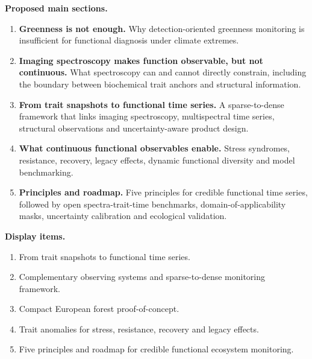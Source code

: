 \documentclass[11pt]{article}
\begin{document}
\textbf{Proposed main sections.}
\begin{enumerate}
\item \textbf{Greenness is not enough.} Why detection-oriented greenness monitoring is insufficient for functional diagnosis under climate extremes.
\item \textbf{Imaging spectroscopy makes function observable, but not continuous.} What spectroscopy can and cannot directly constrain, including the boundary between biochemical trait anchors and structural information.
\item \textbf{From trait snapshots to functional time series.} A sparse-to-dense framework that links imaging spectroscopy, multispectral time series, structural observations and uncertainty-aware product design.
\item \textbf{What continuous functional observables enable.} Stress syndromes, resistance, recovery, legacy effects, dynamic functional diversity and model benchmarking.
\item \textbf{Principles and roadmap.} Five principles for credible functional time series, followed by open spectra-trait-time benchmarks, domain-of-applicability masks, uncertainty calibration and ecological validation.
\end{enumerate}

\textbf{Display items.}
\begin{enumerate}
\item From trait snapshots to functional time series.
\item Complementary observing systems and sparse-to-dense monitoring framework.
\item Compact European forest proof-of-concept.
\item Trait anomalies for stress, resistance, recovery and legacy effects.
\item Five principles and roadmap for credible functional ecosystem monitoring.
\end{enumerate}
\end{document}
